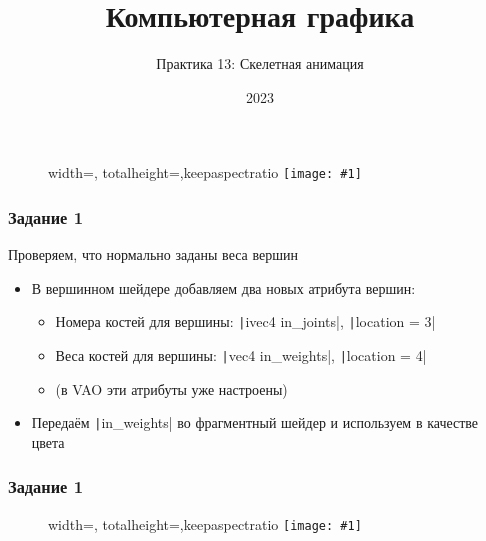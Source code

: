 \documentclass{beamer}
\title{Компьютерная графика}
\subtitle{Практика 13: Скелетная анимация}
\date{2023}
\newcommand{\slideimage}[1]{
  \begin{figure}
    \begin{adjustbox}{width=\textwidth, totalheight=\textheight-2\baselineskip-2\baselineskip,keepaspectratio}
      \texttt{[image: \#1]}
    \end{adjustbox}
  \end{figure}
}
\begin{document}
\frame{\titlepage}

\begin{frame}[fragile]
\slideimage{0.png}
\end{frame}

\begin{frame}[fragile]
\frametitle{Задание 1}
Проверяем, что нормально заданы веса вершин
\begin{itemize}
\item В вершинном шейдере добавляем два новых атрибута вершин:
\begin{itemize}
\item Номера костей для вершины: \texttt|ivec4 in_joints|, \texttt|location = 3|
\item Веса костей для вершины: \texttt|vec4 in_weights|, \texttt|location = 4|
\item (в VAO эти атрибуты уже настроены)
\end{itemize}
\item Передаём \texttt|in_weights| во фрагментный шейдер и используем в качестве цвета
\end{itemize}
\end{frame}

\begin{frame}[fragile]
\frametitle{Задание 1}
\slideimage{1.png}
\end{frame}
\end{document}
